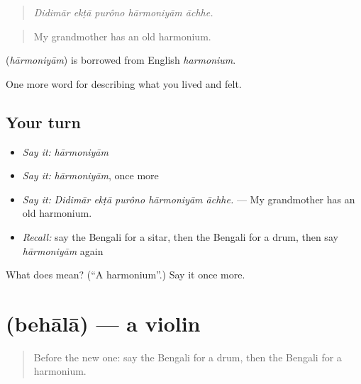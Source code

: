 \begin{quote}
    
\end{quote}

\begin{quote}
\emph{Didimār ekṭā purôno hārmoniyām āchhe.}
\end{quote}

\begin{quote}
My grandmother has an old harmonium.
\end{quote}

\begin{cousinweb}
\textbf{} (\emph{hārmoniyām}) is borrowed from English \emph{harmonium}.
\end{cousinweb}

\begin{grammarlens}[title={What you've built}]
One more word for describing what you lived and felt.
\end{grammarlens}

\subsection*{Your turn}
\begin{itemize}
\raggedright
  \item \emph{Say it:} \emph{hārmoniyām}
  \item \emph{Say it:} \emph{hārmoniyām}, once more
  \item \emph{Say it:} \emph{Didimār ekṭā purôno hārmoniyām āchhe.} — My grandmother has an old harmonium.
  \item \emph{Recall:} say the Bengali for a sitar, then the Bengali for a drum, then say \emph{hārmoniyām} again
\end{itemize}

\begin{tcolorbox}[breakable,colback=teal!4,colframe=teal!35!black,title={Before you move on}]
What does  mean? (\textquotedblleft{}A harmonium\textquotedblright{}.) Say it once more.
\end{tcolorbox}
\section[\texorpdfstring{\bn{বেহালা} (behālā)}{বেহালা (behālā)}]{ (behālā) — a violin}

\label{lesson:BN-C526-behala}



\begin{quote}
Before the new one: say the Bengali for a drum, then the Bengali for a harmonium.
\end{quote}

